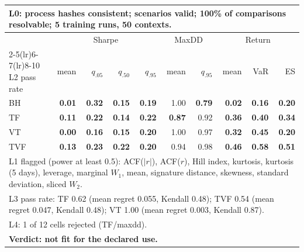 \begin{tabular}{lrrrrrrrrr}
\toprule
\multicolumn{10}{p{13.5cm}}{L0: process hashes consistent; scenarios valid; 100\% of comparisons resolvable; 5 training runs, 50 contexts.} \\
\midrule
 & \multicolumn{4}{c}{Sharpe} & \multicolumn{2}{c}{MaxDD} & \multicolumn{3}{c}{Return} \\
\cmidrule(lr){2-5}\cmidrule(lr){6-7}\cmidrule(lr){8-10}
L2 pass rate & mean & $q_{.05}$ & $q_{.50}$ & $q_{.95}$ & mean & $q_{.95}$ & mean & VaR & ES \\
\midrule
BH & \textbf{0.01} & \textbf{0.32} & \textbf{0.15} & \textbf{0.19} & 1.00 & \textbf{0.79} & \textbf{0.02} & \textbf{0.16} & \textbf{0.20} \\
TF & \textbf{0.11} & \textbf{0.22} & \textbf{0.14} & \textbf{0.22} & \textbf{0.87} & 0.92 & \textbf{0.36} & \textbf{0.40} & \textbf{0.34} \\
VT & \textbf{0.00} & \textbf{0.16} & \textbf{0.15} & \textbf{0.20} & 1.00 & 0.97 & \textbf{0.32} & \textbf{0.45} & \textbf{0.20} \\
TVF & \textbf{0.13} & \textbf{0.23} & \textbf{0.22} & \textbf{0.20} & 0.94 & 0.98 & \textbf{0.46} & \textbf{0.58} & \textbf{0.51} \\
\midrule
\multicolumn{10}{p{13.5cm}}{L1 flagged (power at least 0.5): ACF($|r|$), ACF($r$), Hill index, kurtosis, kurtosis (5 days), leverage, marginal $W_1$, mean, signature distance, skewness, standard deviation, sliced $W_2$.} \\
\multicolumn{10}{p{13.5cm}}{L3 pass rate: TF 0.62 (mean regret 0.055, Kendall 0.48); TVF 0.54 (mean regret 0.047, Kendall 0.48); VT 1.00 (mean regret 0.003, Kendall 0.87).} \\
\multicolumn{10}{p{13.5cm}}{L4: 1 of 12 cells rejected (TF/maxdd).} \\
\multicolumn{10}{p{13.5cm}}{\textbf{Verdict: not fit for the declared use.}} \\
\bottomrule
\end{tabular}
